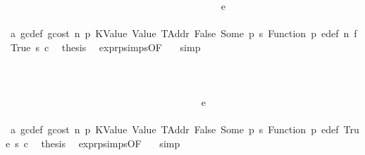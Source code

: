 \begin{isabellebody}
\isanewline
\ \ \ \ \ \ \ \ \ \ \ \ \ \ \ \ \ \ \ \ \ \ \ \ \ \ \ \ \ \ \ \ \ \ \ \ \ \ \ \ \ \ \isamarkupfalse%
\ {\isacharparenleft}{\kern0pt}e\ {\isacharunderscore}{\kern0pt}{\isacharparenright}{\kern0pt}\isanewline
\ \ \ \ \ \ \ \ \ \ \ \ \ \ \ \ \ \ \ \ \ \ \ \ \ \ \ \ \ \ \ \ \ \ \ \ \ \ \ \ \ \ \isamarkupfalse%
\ a{}\ gc{\isacharunderscore}{\kern0pt}def\ gcost\ n\ p{}\ KValue\ Value\ TAddr\ False\ Some\ p{}\ s{}\ Function\ p{}\ e{\isacharprime}{\kern0pt}{\isacharunderscore}{\kern0pt}def\ n{}\ f{}\ True\ s{}\ c\ \isamarkupfalse%
\ {\isacharquery}{\kern0pt}thesis\ \isamarkupfalse%
\ expr{\isachardot}{\kern0pt}psimps{\isacharparenleft}{\kern0pt}{}{}{\isacharparenright}{\kern0pt}{\isacharbrackleft}{\kern0pt}OF\ {}{}{\isacharparenleft}{\kern0pt}{}{\isacharparenright}{\kern0pt}{\isacharbrackright}{\kern0pt}\ \isamarkupfalse%
\ simp\isanewline
\ \ \ \ \ \ \ \ \ \ \ \ \ \ \ \ \ \ \ \ \ \ \ \ \ \ \ \ \ \ \ \ \ \ \ \ \ \ \ \ \isamarkupfalse%
\isanewline
\ \ \ \ \ \ \ \ \ \ \ \ \ \ \ \ \ \ \ \ \ \ \ \ \ \ \ \ \ \ \ \ \ \ \ \ \ \ \isamarkupfalse%
\isanewline
\ \ \ \ \ \ \ \ \ \ \ \ \ \ \ \ \ \ \ \ \ \ \ \ \ \ \ \ \ \ \ \ \ \ \ \ \isamarkupfalse%
\isanewline
\ \ \ \ \ \ \ \ \ \ \ \ \ \ \ \ \ \ \ \ \ \ \ \ \ \ \ \ \ \ \ \ \ \ \ \ \ \ \isamarkupfalse%
\ {\isacharparenleft}{\kern0pt}e\ {\isacharunderscore}{\kern0pt}{\isacharparenright}{\kern0pt}\isanewline
\ \ \ \ \ \ \ \ \ \ \ \ \ \ \ \ \ \ \ \ \ \ \ \ \ \ \ \ \ \ \ \ \ \ \ \ \ \ \isamarkupfalse%
\ a{}\ gc{\isacharunderscore}{\kern0pt}def\ gcost\ n\ p{}\ KValue\ Value\ TAddr\ False\ Some\ p{}\ s{}\ Function\ p{}\ e{\isacharprime}{\kern0pt}{\isacharunderscore}{\kern0pt}def\ True\ s{}\ c\ \isamarkupfalse%
\ {\isacharquery}{\kern0pt}thesis\ \isamarkupfalse%
\ expr{\isachardot}{\kern0pt}psimps{\isacharparenleft}{\kern0pt}{}{}{\isacharparenright}{\kern0pt}{\isacharbrackleft}{\kern0pt}OF\ {}{}{\isacharparenleft}{\kern0pt}{}{\isacharparenright}{\kern0pt}{\isacharbrackright}{\kern0pt}\ \isamarkupfalse%
\ simp\isanewline
\ \ \ \ \ \ \ \ \ \ \ \ \ \ \ \ \ \ \ \ \ \ \ \ \ \ \ \ \ \ \ \ \ \ \ \ \isamarkupfalse%
\isanewline

\end{isabellebody}
